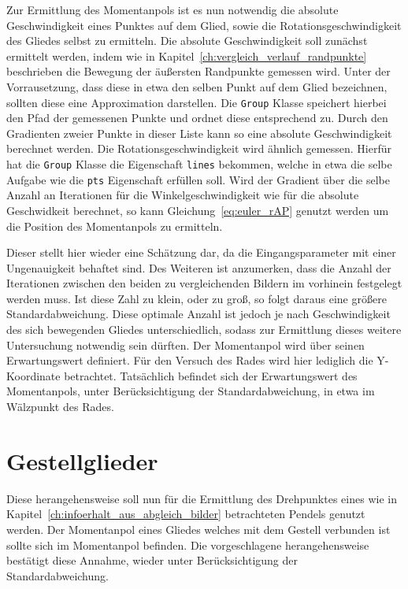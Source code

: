 Zur Ermittlung des Momentanpols ist es nun notwendig die absolute Geschwindigkeit eines Punktes auf dem Glied, sowie die Rotationsgeschwindigkeit des Gliedes selbst zu ermitteln.
Die absolute Geschwindigkeit soll zunächst ermittelt werden, indem wie in Kapitel~\ref{ch:vergleich_verlauf_randpunkte} beschrieben die Bewegung der äußersten Randpunkte gemessen wird.
Unter der Vorrausetzung, dass diese in etwa den selben Punkt auf dem Glied bezeichnen, sollten diese eine Approximation darstellen.
Die \lstinline{Group} Klasse speichert hierbei den Pfad der gemessenen Punkte und ordnet diese entsprechend zu.
Durch den Gradienten zweier Punkte in dieser Liste kann so eine absolute Geschwindigkeit berechnet werden.
Die Rotationsgeschwindigkeit wird ähnlich gemessen.
Hierfür hat die \lstinline{Group} Klasse die Eigenschaft \lstinline{lines} bekommen, welche in etwa die selbe Aufgabe wie die \lstinline{pts} Eigenschaft erfüllen soll.
Wird der Gradient über die selbe Anzahl an Iterationen für die Winkelgeschwindigkeit wie für die absolute Geschwidkeit berechnet, so kann Gleichung~\ref{eq:euler_rAP} genutzt werden um die Position des Momentanpols zu ermitteln.

Dieser stellt hier wieder eine Schätzung dar, da die Eingangsparameter mit einer Ungenauigkeit behaftet sind.
Des Weiteren ist anzumerken, dass die Anzahl der Iterationen zwischen den beiden zu vergleichenden Bildern im vorhinein festgelegt werden muss.
Ist diese Zahl zu klein, oder zu groß, so folgt daraus eine größere Standardabweichung.
Diese optimale Anzahl ist jedoch je nach Geschwindigkeit des sich bewegenden Gliedes unterschiedlich, sodass zur Ermittlung dieses weitere Untersuchung notwendig sein dürften.
Der Momentanpol wird über seinen Erwartungswert definiert.
Für den Versuch des Rades wird hier lediglich die Y-Koordinate betrachtet.
Tatsächlich befindet sich der Erwartungswert des Momentanpols, unter Berücksichtigung der Standardabweichung, in etwa im Wälzpunkt des Rades.

\section{Gestellglieder}

Diese herangehensweise soll nun für die Ermittlung des Drehpunktes eines wie in Kapitel~\ref{ch:infoerhalt_aus_abgleich_bilder} betrachteten Pendels genutzt werden.
Der Momentanpol eines Gliedes welches mit dem Gestell verbunden ist sollte sich im Momentanpol befinden.
Die vorgeschlagene herangehensweise bestätigt diese Annahme, wieder unter Berücksichtigung der Standardabweichung.

